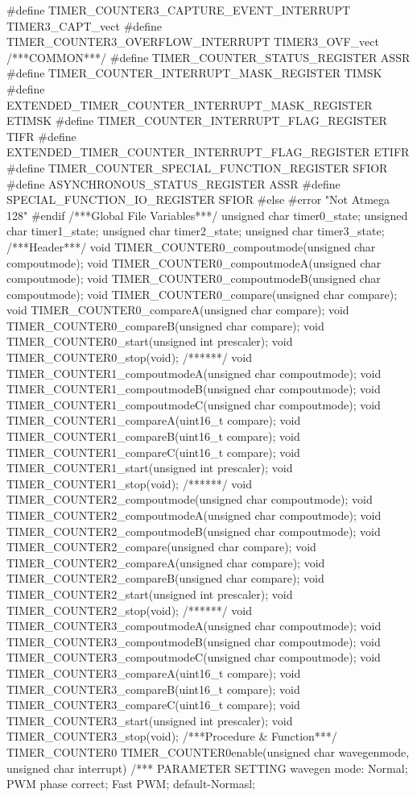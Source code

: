 \begin{verbatimtab}
#define TIMER_COUNTER3_CAPTURE_EVENT_INTERRUPT TIMER3_CAPT_vect
#define TIMER_COUNTER3_OVERFLOW_INTERRUPT TIMER3_OVF_vect
/***COMMON***/
#define TIMER_COUNTER_STATUS_REGISTER ASSR
#define TIMER_COUNTER_INTERRUPT_MASK_REGISTER TIMSK
#define EXTENDED_TIMER_COUNTER_INTERRUPT_MASK_REGISTER ETIMSK
#define TIMER_COUNTER_INTERRUPT_FLAG_REGISTER TIFR
#define EXTENDED_TIMER_COUNTER_INTERRUPT_FLAG_REGISTER ETIFR
#define TIMER_COUNTER_SPECIAL_FUNCTION_REGISTER SFIOR
#define ASYNCHRONOUS_STATUS_REGISTER ASSR
#define SPECIAL_FUNCTION_IO_REGISTER SFIOR
#else
#error "Not Atmega 128"
#endif
/***Global File Variables***/
unsigned char timer0_state;
unsigned char timer1_state;
unsigned char timer2_state;
unsigned char timer3_state;
/***Header***/
void TIMER_COUNTER0_compoutmode(unsigned char compoutmode);
void TIMER_COUNTER0_compoutmodeA(unsigned char compoutmode);
void TIMER_COUNTER0_compoutmodeB(unsigned char compoutmode);
void TIMER_COUNTER0_compare(unsigned char compare);
void TIMER_COUNTER0_compareA(unsigned char compare);
void TIMER_COUNTER0_compareB(unsigned char compare);
void TIMER_COUNTER0_start(unsigned int prescaler);
void TIMER_COUNTER0_stop(void);
/******/
void TIMER_COUNTER1_compoutmodeA(unsigned char compoutmode);
void TIMER_COUNTER1_compoutmodeB(unsigned char compoutmode);
void TIMER_COUNTER1_compoutmodeC(unsigned char compoutmode);
void TIMER_COUNTER1_compareA(uint16_t compare);
void TIMER_COUNTER1_compareB(uint16_t compare);
void TIMER_COUNTER1_compareC(uint16_t compare);
void TIMER_COUNTER1_start(unsigned int prescaler);
void TIMER_COUNTER1_stop(void);
/******/
void TIMER_COUNTER2_compoutmode(unsigned char compoutmode);
void TIMER_COUNTER2_compoutmodeA(unsigned char compoutmode);
void TIMER_COUNTER2_compoutmodeB(unsigned char compoutmode);
void TIMER_COUNTER2_compare(unsigned char compare);
void TIMER_COUNTER2_compareA(unsigned char compare);
void TIMER_COUNTER2_compareB(unsigned char compare);
void TIMER_COUNTER2_start(unsigned int prescaler);
void TIMER_COUNTER2_stop(void);
/******/
void TIMER_COUNTER3_compoutmodeA(unsigned char compoutmode);
void TIMER_COUNTER3_compoutmodeB(unsigned char compoutmode);
void TIMER_COUNTER3_compoutmodeC(unsigned char compoutmode);
void TIMER_COUNTER3_compareA(uint16_t compare);
void TIMER_COUNTER3_compareB(uint16_t compare);
void TIMER_COUNTER3_compareC(uint16_t compare);
void TIMER_COUNTER3_start(unsigned int prescaler);
void TIMER_COUNTER3_stop(void);
/***Procedure & Function***/
TIMER_COUNTER0 TIMER_COUNTER0enable(unsigned char wavegenmode, unsigned char interrupt)
/***
PARAMETER SETTING
wavegen mode: Normal; PWM phase correct; Fast PWM; default-Normasl;

\end{verbatimtab}
